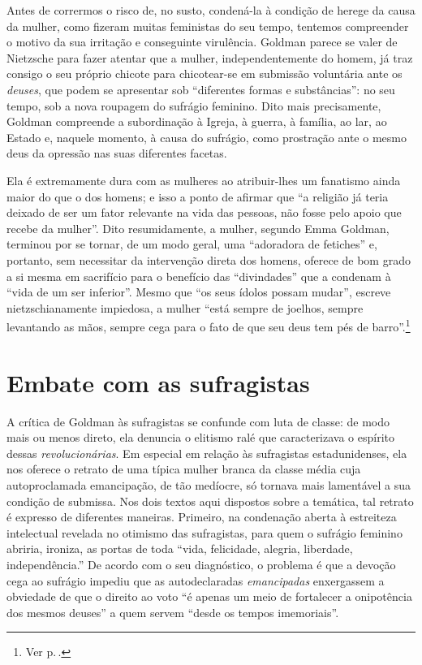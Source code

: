 Antes de corrermos o risco de, no susto,
condená-la à condição de herege da causa da mulher, como
fizeram muitas feministas do seu tempo, tentemos
compreender o motivo da sua irritação e conseguinte virulência.
Goldman parece se valer de Nietzsche para fazer atentar que a mulher,
independentemente do homem, já traz consigo o seu próprio chicote para
chicotear-se em submissão voluntária ante os \textit{deuses}, que podem se
apresentar sob ``diferentes formas e substâncias'': no seu
tempo, sob a nova roupagem do sufrágio feminino. Dito mais precisamente,
Goldman compreende a subordinação à Igreja, à guerra, à família, ao lar,
ao Estado e, naquele momento, à causa do sufrágio, como prostração ante
o mesmo deus da opressão nas suas diferentes facetas.

Ela é extremamente
dura com as mulheres ao atribuir-lhes um fanatismo ainda maior do que o
dos homens; e isso a ponto de afirmar que ``a religião já teria deixado
de ser um fator relevante na vida das pessoas, não fosse pelo apoio que
recebe da mulher''. Dito resumidamente, a mulher, segundo Emma Goldman,
terminou por se tornar, de um modo geral, uma ``adoradora de fetiches''
e, portanto, sem necessitar da intervenção direta dos homens, oferece
de bom grado a si mesma em sacrifício para o benefício das
``divindades'' que a condenam à ``vida de um ser inferior''. Mesmo que
``os seus ídolos possam mudar'', escreve nietzschianamente impiedosa,
a mulher ``está sempre de joelhos, sempre levantando as mãos, sempre
cega para o fato de que seu deus tem pés de barro''.\footnote{Ver p.\,\pageref{barro}.}

\section{Embate com as sufragistas}

A crítica de Goldman às sufragistas se confunde com luta de classe: de
modo mais ou menos direto, ela denuncia o elitismo ralé que
caracterizava o espírito dessas \textit{revolucionárias}. Em especial
em relação às sufragistas estadunidenses, ela nos oferece o
retrato de uma típica mulher branca da classe média cuja autoproclamada
emancipação, de tão medíocre, só tornava mais lamentável a sua condição
de submissa. Nos dois textos aqui dispostos sobre a temática, tal
retrato é expresso de diferentes maneiras. Primeiro, na condenação
aberta à estreiteza intelectual revelada no otimismo das sufragistas,
para quem o sufrágio feminino abriria, ironiza, as portas de toda
``vida, felicidade, alegria, liberdade, independência.'' De acordo com o
seu diagnóstico, o problema é que a devoção cega ao sufrágio impediu
que as autodeclaradas \textit{emancipadas} enxergassem a obviedade de que o
direito ao voto ``é apenas um meio de fortalecer a onipotência dos
mesmos deuses'' a quem servem ``desde os tempos imemoriais''.


